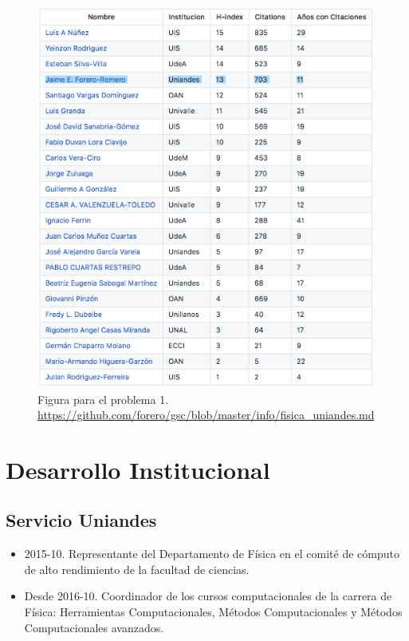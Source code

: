 \documentclass{article}
\begin{document}
\begin{figure}[!h]
\begin{center}
\includegraphics[scale=0.60]{scholar_astronomia.png}
\caption{Figura para el problema 1. \url{https://github.com/forero/gsc/blob/master/info/fisica_uniandes.md}\label{table:astro}}
\end{center}
\end{figure}



\newpage
\section{Desarrollo Institucional}


\subsection{Servicio Uniandes}
\begin{itemize}
\item {2015-10. Representante del Departamento de F\'isica en el comit\'e
  de c\'omputo de alto rendimiento de la facultad de ciencias.}
\item {Desde 2016-10. Coordinador de los cursos computacionales de la carrera de
  F\'isica: Herramientas Computacionales, M\'etodos Computacionales y
  M\'etodos Computacionales avanzados.} 
\end{itemize}
\end{document}
